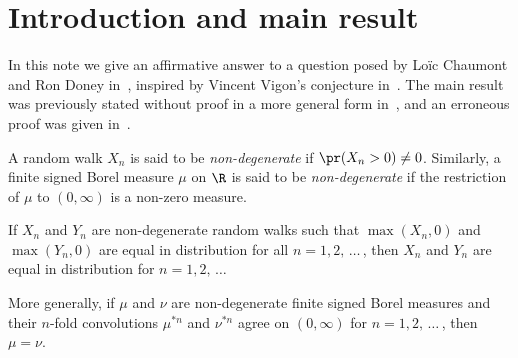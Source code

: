 \section{Introduction and main result}

In this note we give an affirmative answer to a question posed by Lo\"ic Chaumont and Ron Doney in~\cite{bib:cd17}, inspired by Vincent Vigon's conjecture in~\cite{bib:v02}. The main result was previously stated without proof in a more general form in~\cite{bib:ou90}, and an erroneous proof was given in~\cite{bib:u94}.

A random walk $X_n$ is said to be \emph{non-degenerate} if $\pr(X_n > 0) \ne 0$. Similarly, a finite signed Borel measure $\mu$ on $\R$ is said to be \emph{non-degenerate} if the restriction of $\mu$ to $(0, \infty)$ is a non-zero measure.

\begin{theo}\label{thm:wh}
If $X_n$ and $Y_n$ are non-degenerate random walks such that $\max(X_n, 0)$ and $\max(Y_n, 0)$ are equal in distribution for all $n = 1, 2,\,\ldots\,$, then $X_n$ and $Y_n$ are equal in distribution for $n = 1, 2,\,\ldots$

More generally, if $\mu$ and $\nu$ are non-degenerate finite signed Borel measures and their $n$-fold convolutions $\mu^{*n}$ and $\nu^{*n}$ agree on $(0, \infty)$ for $n = 1, 2,\,\ldots\,$, then $\mu = \nu$.
\end{theo}

